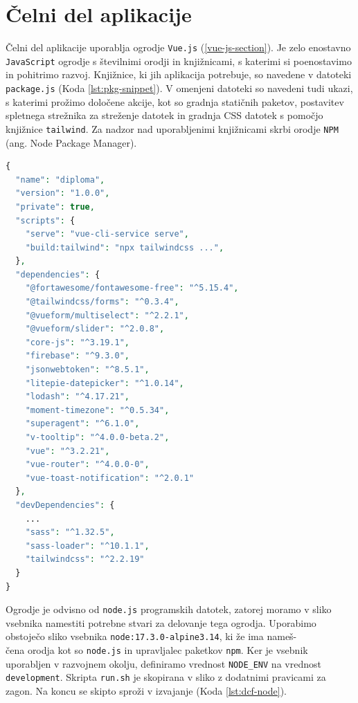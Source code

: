 \documentclass[a4paper, 12pt]{book}
\begin{document}
\section{Čelni del aplikacije}
Čelni del aplikacije uporablja ogrodje \verb=Vue.js= (\ref{vue-js-section}). Je zelo enostavno \verb=JavaScript= ogrodje s številnimi orodji in knjižnicami, s katerimi si poenostavimo in pohitrimo razvoj. Knjižnice, ki jih aplikacija potrebuje, so navedene v datoteki \verb=package.js= (Koda \ref{lst:pkg-snippet}). V omenjeni datoteki so navedeni tudi ukazi, s katerimi prožimo določene akcije, kot so gradnja statičnih paketov, postavitev spletnega strežnika za streženje datotek in gradnja CSS datotek s pomočjo knjižnice \verb=tailwind=. Za nadzor nad uporabljenimi knjižnicami skrbi orodje \verb=NPM= (ang. Node Package Manager).

\begin{lstlisting}[language=php, style=mystyle,caption={Izsek naštetih knjižnic in ukazov v datoteki package.json.},label=lst:pkg-snippet]
{
  "name": "diploma",
  "version": "1.0.0",
  "private": true,
  "scripts": {
    "serve": "vue-cli-service serve",
    "build:tailwind": "npx tailwindcss ...",
  },
  "dependencies": {
    "@fortawesome/fontawesome-free": "^5.15.4",
    "@tailwindcss/forms": "^0.3.4",
    "@vueform/multiselect": "^2.2.1",
    "@vueform/slider": "^2.0.8",
    "core-js": "^3.19.1",
    "firebase": "^9.3.0",
    "jsonwebtoken": "^8.5.1",
    "litepie-datepicker": "^1.0.14",
    "lodash": "^4.17.21",
    "moment-timezone": "^0.5.34",
    "superagent": "^6.1.0",
    "v-tooltip": "^4.0.0-beta.2",
    "vue": "^3.2.21",
    "vue-router": "^4.0.0-0",
    "vue-toast-notification": "^2.0.1"
  },
  "devDependencies": {
    ...
    "sass": "^1.32.5",
    "sass-loader": "^10.1.1",
    "tailwindcss": "^2.2.19"
  }
}
\end{lstlisting}



Ogrodje je odvisno od \verb=node.js= programskih datotek, zatorej moramo v sliko vsebnika namestiti potrebne stvari za delovanje tega ogrodja. Uporabimo obstoječo sliko vsebnika \texttt{node:17.3.0-alpine3.14}, ki že ima nameš-\\čena orodja kot so \texttt{node.js} in upravljalec paketkov \texttt{npm}. Ker je vsebnik uporabljen v razvojnem okolju, definiramo vrednost \texttt{NODE\_ENV} na vrednost \texttt{development}. Skripta \texttt{run.sh} je skopirana v sliko z dodatnimi pravicami za zagon. Na koncu se skipto sproži v izvajanje (Koda \ref{lst:dcf-node}).
\end{document}
